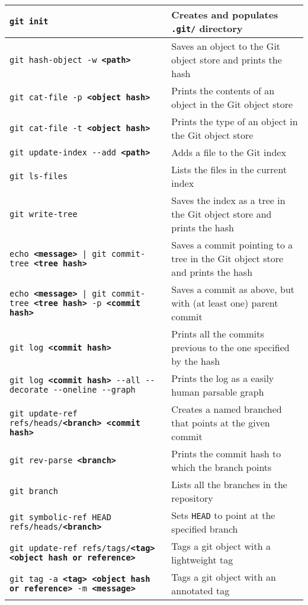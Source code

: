 \documentclass[a4paper]{article}
\begin{document}
\begin{tabular}{ p{} p{} }
  \texttt{git init} & Creates and populates \texttt{.git/} directory \\
  \hline
  \texttt{git hash-object -w \textbf{<path>}} & Saves an object to the Git
    object store and prints the hash \\
  \hline
  \texttt{git cat-file -p \textbf{<object hash>}} & Prints the contents of an
    object in the Git object store \\
  \hline
  \texttt{git cat-file -t \textbf{<object hash>}} & Prints the type of an object
    in the Git object store \\
  \hline
  \texttt{git update-index -{}-add \textbf{<path>}} & Adds a file to the Git
    index \\
  \hline
  \texttt{git ls-files} & Lists the files in the current index \\
  \hline
  \texttt{git write-tree} & Saves the index as a tree in the Git object store
  and prints the hash \\
  \hline
  \texttt{echo \textbf{<message>} | git commit-tree \textbf{<tree hash>}} &
    Saves a commit pointing to a tree in the Git object store and prints the
    hash \\
  \hline
  \texttt{echo \textbf{<message>} | git commit-tree \textbf{<tree hash>} -p
  \textbf{<commit hash>}} &
    Saves a commit as above, but with (at least one) parent commit \\
  \hline
  \texttt{git log \textbf{<commit hash>}} & Prints all the commits previous to
    the one specified by the hash \\
  \hline
  \texttt{git log \textbf{<commit hash>} -{}-all -{}-decorate -{}-oneline -{}-graph} &
    Prints the log as a easily human parsable graph \\
  \hline
  \texttt{git update-ref refs/heads/\textbf{<branch>} \textbf{<commit hash>}} &
    Creates a named branched that points at the given commit \\
  \hline
  \texttt{git rev-parse \textbf{<branch>}} & Prints the commit hash to which the
    branch points \\
  \hline
  \texttt{git branch} & Lists all the branches in the repository \\
  \hline
  \texttt{git symbolic-ref HEAD refs/heads/\textbf{<branch>}} &
    Sets \texttt{HEAD} to point at the specified branch \\
  \hline
  \texttt{git update-ref refs/tags/\textbf{<tag>} \textbf{<object hash or reference>}} &
    Tags a git object with a lightweight tag \\
  \hline
  \texttt{git tag -a \textbf{<tag>} \textbf{<object hash or reference>} -m \textbf{<message>}} &
    Tags a git object with an annotated tag \\
  \hline
\end{tabular}
\end{document}

